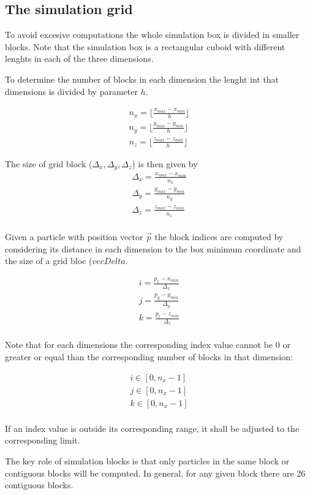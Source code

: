 \subsection{The simulation grid}

To avoid excesive computations the whole simulation box is divided in smaller
blocks. Note that the simulation box is a rectangular cuboid with different
lenghts in each of the three dimensions. 

To determine the number of blocks in each dimension the lenght int that
dimensions is divided by parameter $h$.

\[
\begin{split}
n_x = \lfloor \frac{x_{max}- x_{min}}{h} \rfloor\\
n_y = \lfloor \frac{y_{max}- y_{min}}{h} \rfloor\\
n_z = \lfloor \frac{z_{max}- z_{min}}{h} \rfloor
\end{split}
\]

The size of grid block ($\Delta_x, \Delta_y, \Delta_z$) is then given by
\[
\begin{split}
\Delta_x = \frac{x_{max} - x_{min}}{n_x}\\
\Delta_y = \frac{y_{max} - y_{min}}{n_y}\\
\Delta_z = \frac{z_{max} - z_{min}}{n_z}\\
\end{split}
\] 

Given a particle with position vector $\vec{p}$ the block indices are computed
by considering its distance in each dimension to the box minimum coordinate
and the size of a grid bloc ($vec{Delta}$.

\[
\begin{split}
i = \frac{p_x - x_{min}}{\Delta_x}\\
j = \frac{p_y - y_{min}}{\Delta_y}\\
k = \frac{p_z - z_{min}}{\Delta_z}\\
\end{split}
\]

Note that for each dimensions the corresponding index value cannot be $0$ or
greater or equal than the corresponding number of blocks in that dimension:

\[
\begin{split}
i \in [0, n_x-1]\\
j \in [0, n_x-1]\\
k \in [0, n_x-1]\\
\end{split}
\]

If an index value is outside its corresponding range, it shall be adjusted to
the corresponding limit.

The key role of simulation blocks is that only particles in the same block or
contiguous blocks will be computed. In general, for any given block there are
26 contiguous blocks.
